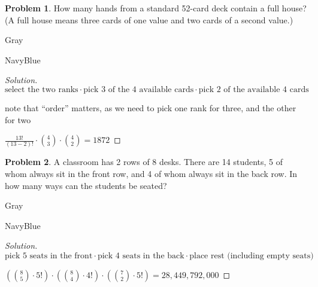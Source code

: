 \documentclass[12pt]{amsart}
\newcounter{problem_number}[section]
\theoremstyle{named}
\newenvironment{soln}
{\begin{color}{Gray}\begin{framed}\begin{color}{NavyBlue}\begin{proof}[Solution]
\doublespacing}
{\end{proof}\end{color}\end{framed}\end{color}}
\theoremstyle{definition}
\newtheorem{problem}{Problem}
\begin{document}
\phantom{ }
		
\phantom{ }
		
\phantom{ }
		
\phantom{ }
		
\phantom{ }

\begin{problem}
	How many hands from a standard 52-card deck contain a full house? (A full house means three cards of one value and two cards of a second value.)
\end{problem}

\begin{soln}
	\phantom{ }

	\noindent $\text{select the two ranks}\cdot \text{pick 3 of the 4 available cards}\cdot\text{pick 2 of the available 4 cards}$

	\noindent *note that ``order'' matters, as we need to pick one rank for three, and the other for two 

    $\displaystyle\frac{13!}{(13-2)!} \cdot {4 \choose 3} \cdot {4 \choose 2} = 1872$
\end{soln}

\begin{problem}
	A classroom has 2 rows of 8 desks. There are 14 students, 5 of whom always sit in the front row, and 4 of whom always sit in the back row. In how many ways can the students be seated?
\end{problem}

\begin{soln}
	\phantom{ }
	
	\noindent $\text{pick 5 seats in the front} \cdot \text{pick 4 seats in the back}
	\cdot \text{place rest (including empty seats)}$

	\noindent $\displaystyle({8 \choose 5}\cdot 5!) \cdot ({8 \choose 4} \cdot 4!) \cdot ({7 \choose 2} \cdot 5!) = 28,449,792,000$

\end{soln}

\end{document}
